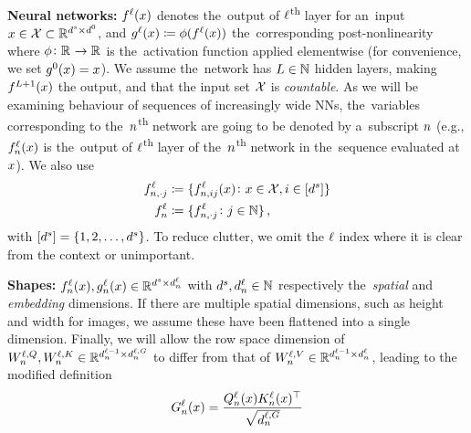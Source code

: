 \documentclass{article}
\begin{document}
\textbf{Neural networks:}
${f}^{\ell}_{}{(x)}$ denotes the~output of $\ell$\textsuperscript{th} layer for an~input $x \in \mathcal{X} \subset \mathbb{R}^{d^s \times d^{0}}$, and ${g}^{\ell}_{}{(x)} \coloneqq \phi ({f}^{\ell}_{}{(x)})$ the~corresponding post-nonlinearity where $\phi \colon \mathbb{R}^{} \to \mathbb{R}^{}$ is the~activation function applied elementwise (for convenience, we set ${g}^{0}_{}{(x)} = x$).
We assume the~network has $L \in \mathbb{N}$ hidden layers, making ${f}^{L + 1}_{}{(x)}$
the output,
and that the input set $\mathcal{X}$ is \emph{countable}.
As we will be examining behaviour of sequences of increasingly wide NNs, the~variables corresponding to the~$n$\textsuperscript{th} network are going to be denoted by a~subscript $n$ (e.g., ${f}^{\ell}_{n}{(x)}$ is the~output of $\ell$\textsuperscript{th} layer of the~$n$\textsuperscript{th} network in the~sequence evaluated at $x$).
We also use
\begin{align*}
    f_{n, \cdot j}^{\ell} 
    &\coloneqq 
    \{ 
        {f}^{\ell}_{n, ij}{(x)} 
        \colon 
        x \in \mathcal{X},
        i \in [d^s]
    \} 
    \\
    f_{n}^{\ell} 
    &\coloneqq 
    \{ 
        f_{n, \cdot j}^{\ell} 
        \colon 
        j \in \mathbb{N} 
    \} 
    \, ,
\end{align*}
with $[d^s] = \{1, 2, \ldots, d^s \}$.
To reduce clutter, we omit the $\ell$ index where it is clear from the context or unimportant.

\textbf{Shapes:} ${f}^{\ell}_{n}{(x)}, {g}^{\ell}_{n}{(x)} \in \mathbb{R}^{d^s \times d_{n}^{\ell}}$ with $d^s, d_{n}^{\ell} \in \mathbb{N}$ respectively the~\emph{spatial} and \emph{embedding} dimensions.
If there are multiple spatial dimensions, such as height and width for images, we assume these have been flattened into a single dimension.
Finally, we will allow the row space dimension of $W_{n}^{\ell,Q}, W_{n}^{\ell,K} \in \mathbb{R}^{d_{n}^{\ell - 1} \times d_{n}^{\ell, G}}$ to differ from that of $W_{n}^{\ell,V} \in \mathbb{R}^{d_{n}^{\ell - 1} \times d_{n}^{\ell}}$, leading to the modified definition 
\begin{align}\label{eq:logit_def}
    G_{n}^{\ell} (x)
    =
    \frac{Q_{n}^{\ell}(x) K_{n}^{\ell} (x)^\top}{\sqrt{d_{n}^{\ell, G}}}
\end{align}
\end{document}
